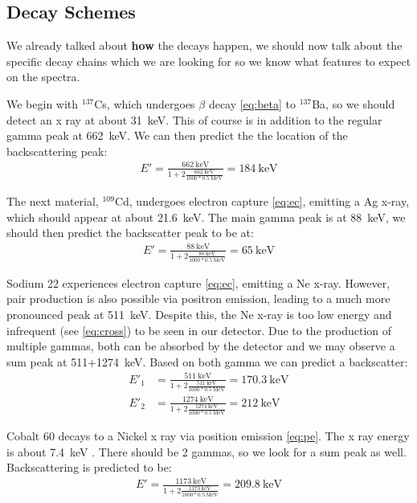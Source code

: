 \documentclass[letterpaper,12pt]{article}
\begin{document}
\subsection{Decay Schemes}
We already talked about \textbf{how} the decays happen, we should now talk about the specific decay chains which we are looking for so we know what features to expect on the spectra.

We begin with $^{137}$Cs, which undergoes $\beta$ decay \eqref{eq:beta} to $^{137}$Ba, so we should detect an x ray at about \SI{31}{\kilo\eV}. This of course is in addition to the regular gamma peak at \SI{662}{\kilo\eV}. We can then predict the the location of the backscattering peak:
\begin{align*}
  E'=\frac{\SI{662}{\kilo\eV}}
  {1+2\frac{\SI{662}{\kilo\eV}}{1000*\SI{0.5}{\mega\eV}}}
  =\boxed{\SI{184}{\kilo\eV}}
\end{align*}

The next material, $^{109}$Cd, undergoes electron capture \eqref{eq:ec}, emitting a Ag x-ray, which should appear at about \SI{21.6}{\kilo\eV}. The main gamma peak is at \SI{88}{\kilo\eV}, we should then predict the backscatter peak to be at:
\begin{align*}
  E'=\frac{\SI{88}{\kilo\eV}}
  {1+2\frac{\SI{88}{\kilo\eV}}{1000*\SI{0.5}{\mega\eV}}}
  =\boxed{\SI{65}{\kilo\eV}}
\end{align*}

Sodium 22 experiences electron capture \eqref{eq:ec}, emitting a Ne x-ray. However, pair production is also possible via positron emission, leading to a much more pronounced peak at \SI{511}{\kilo\eV}. Despite this, the Ne x-ray is too low energy and infrequent (see \eqref{eq:cross}) to be seen in our detector. Due to the production of multiple gammas, both can be absorbed by the detector and we may observe a sum peak at 511+\SI{1274}{\keV}. Based on both gamma we can predict a backscatter:
\begin{align*}
  E'_1&=\frac{\SI{511}{\kilo\eV}}
  {1+2\frac{\SI{511}{\kilo\eV}}{1000*\SI{0.5}{\mega\eV}}}
  =\boxed{\SI{170.3}{\kilo\eV}}\\
  E'_2&=\frac{\SI{1274}{\kilo\eV}}
  {1+2\frac{\SI{1274}{\kilo\eV}}{1000*\SI{0.5}{\mega\eV}}}
  =\boxed{\SI{212}{\kilo\eV}}
\end{align*}

Cobalt 60 decays to a Nickel x ray via position emission \eqref{eq:pe}. The x ray energy is about \SI{7.4}{\keV} \cite{TabRad_v5}. There should be 2 gammas, so we look for a sum peak as well. Backscattering is predicted to be:
\begin{align*}
  E'=\frac{\SI{1173}{\kilo\eV}}
  {1+2\frac{\SI{1173}{\kilo\eV}}{1000*\SI{0.5}{\mega\eV}}}
  =\boxed{\SI{209.8}{\kilo\eV}}
\end{align*}
\end{document}
